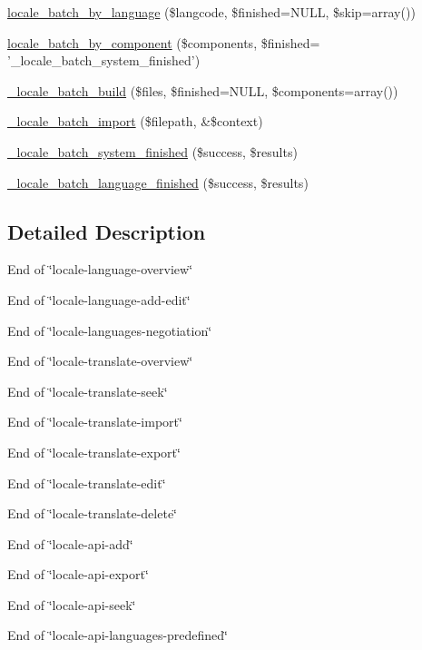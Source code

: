 \begin{CompactItemize}
\hyperlink{group__locale_g2c34cb914394a45fb4e94561bfc26b71}{locale\_\-batch\_\-by\_\-language} (\$langcode, \$finished=NULL, \$skip=array())
\item 
\hyperlink{group__locale_ga6ec98b4c2d6b82b6f206bafcf7d2ce6}{locale\_\-batch\_\-by\_\-component} (\$components, \$finished= '\_\-locale\_\-batch\_\-system\_\-finished')
\item 
\hyperlink{group__locale_g4f10893e8ed214fe4739b9415a06948a}{\_\-locale\_\-batch\_\-build} (\$files, \$finished=NULL, \$components=array())
\item 
\hyperlink{group__locale_g97c8b79262e3aa8af4e5ea3b7908b99b}{\_\-locale\_\-batch\_\-import} (\$filepath, \&\$context)
\item 
\hyperlink{group__locale_g3b7cc14a5735d2aee066dd4f6bb517b8}{\_\-locale\_\-batch\_\-system\_\-finished} (\$success, \$results)
\item 
\hyperlink{group__locale_g06bd6310727083246869907515bea547}{\_\-locale\_\-batch\_\-language\_\-finished} (\$success, \$results)
\end{CompactItemize}


\subsection{Detailed Description}
End of \char`\"{}locale-language-overview\char`\"{}

End of \char`\"{}locale-language-add-edit\char`\"{}

End of \char`\"{}locale-languages-negotiation\char`\"{}

End of \char`\"{}locale-translate-overview\char`\"{}

End of \char`\"{}locale-translate-seek\char`\"{}

End of \char`\"{}locale-translate-import\char`\"{}

End of \char`\"{}locale-translate-export\char`\"{}

End of \char`\"{}locale-translate-edit\char`\"{}

End of \char`\"{}locale-translate-delete\char`\"{}

End of \char`\"{}locale-api-add\char`\"{}

End of \char`\"{}locale-api-export\char`\"{}

End of \char`\"{}locale-api-seek\char`\"{}

End of \char`\"{}locale-api-languages-predefined\char`\"{} 

